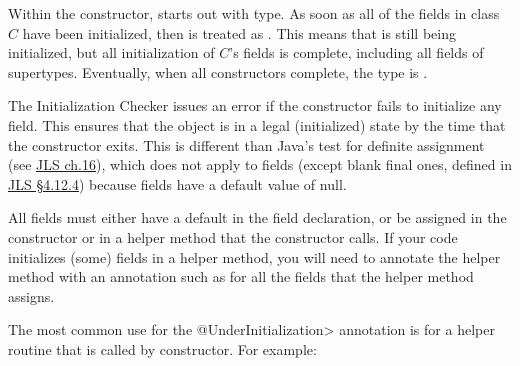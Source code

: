 


Within the constructor,
 starts out with  type.
As soon as all of the  fields
in class $C$ have been initialized, then  is treated as
.
This means that  is still being initialized, but all
initialization of $C$'s fields is complete, including all fields of supertypes.
Eventually, when all constructors complete, the type is
.

The Initialization Checker issues an error if the constructor fails to initialize
any  field.  This ensures that the object is in a legal (initialized)
state by the time that the constructor exits.
This is different than Java's test for definite assignment (see
\href{https://docs.oracle.com/javase/specs/jls/se11/html/jls-16.html}{JLS ch.16}),
which does not apply to fields (except blank final ones, defined in
\href{https://docs.oracle.com/javase/specs/jls/se11/html/jls-4.html#jls-4.12.4}{JLS \S 4.12.4}) because fields
have a default value of null.


All  fields must either have a
default in the field declaration, or be assigned in the constructor or in a
helper method that the constructor calls.  If
your code initializes (some) fields in a helper method, you will need to
annotate the helper method with an annotation such as
for all the fields that the helper method assigns.




The most common use for the \<@UnderInitialization> annotation is for a
helper routine that is called by constructor.  For example:

